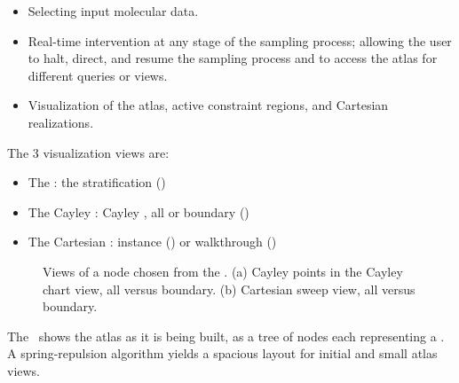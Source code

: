 \begin{itemize}
\item Selecting input molecular data. 

\item Real-time intervention at any stage of the sampling process;
allowing the user to halt, direct, and resume the sampling process and
to access the atlas for different queries or views.

\item Visualization of the atlas, active constraint regions, and
Cartesian realizations.
\end{itemize}


The 3 visualization views are:

\begin{itemize}
\item The \aview: the stratification ()

\item The Cayley \pview: Cayley \chart, all or boundary
()

\item The Cartesian \rview: instance () or
walkthrough ()
\end{itemize}



\begin{figure}[h!tbp]
\centering
\def\wid{.45\linewidth} %
\label{fig:spaceandsweep}
\caption[The various views of a single node chosen from the
\atlas.]{Views of a node chosen from the \atlas. (a) Cayley points in
the Cayley chart view, all versus boundary. (b) Cartesian sweep view,
all versus boundary.}
\end{figure}


The \aview\ shows the atlas as it is being built, as a tree of nodes
each representing a \cgraph. A spring-repulsion algorithm yields a
spacious layout for initial and small atlas views. 

